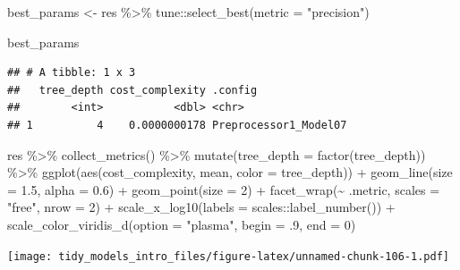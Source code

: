 \documentclass[
]{article}
\newenvironment{Shaded}{\begin{snugshade}}{\end{snugshade}}
\newcommand{\AttributeTok}[1]{\textcolor[rgb]{0.77,0.63,0.00}{#1}}
\newcommand{\DecValTok}[1]{\textcolor[rgb]{0.00,0.00,0.81}{#1}}
\newcommand{\FloatTok}[1]{\textcolor[rgb]{0.00,0.00,0.81}{#1}}
\newcommand{\FunctionTok}[1]{\textcolor[rgb]{0.00,0.00,0.00}{#1}}
\newcommand{\NormalTok}[1]{#1}
\newcommand{\OtherTok}[1]{\textcolor[rgb]{0.56,0.35,0.01}{#1}}
\newcommand{\SpecialCharTok}[1]{\textcolor[rgb]{0.00,0.00,0.00}{#1}}
\newcommand{\StringTok}[1]{\textcolor[rgb]{0.31,0.60,0.02}{#1}}
\begin{document}
\begin{Shaded}
\begin{Highlighting}[]
\NormalTok{best\_params }\OtherTok{\textless{}{-}}
\NormalTok{  res }\SpecialCharTok{\%\textgreater{}\%}
\NormalTok{  tune}\SpecialCharTok{::}\FunctionTok{select\_best}\NormalTok{(}\AttributeTok{metric =} \StringTok{"precision"}\NormalTok{)}

\NormalTok{best\_params}
\end{Highlighting}
\end{Shaded}

\begin{verbatim}
## # A tibble: 1 x 3
##   tree_depth cost_complexity .config              
##        <int>           <dbl> <chr>                
## 1          4    0.0000000178 Preprocessor1_Model07
\end{verbatim}

\begin{Shaded}
\begin{Highlighting}[]
\NormalTok{res }\SpecialCharTok{\%\textgreater{}\%}
  \FunctionTok{collect\_metrics}\NormalTok{() }\SpecialCharTok{\%\textgreater{}\%}
  \FunctionTok{mutate}\NormalTok{(}\AttributeTok{tree\_depth =} \FunctionTok{factor}\NormalTok{(tree\_depth)) }\SpecialCharTok{\%\textgreater{}\%}
  \FunctionTok{ggplot}\NormalTok{(}\FunctionTok{aes}\NormalTok{(cost\_complexity, mean, }\AttributeTok{color =}\NormalTok{ tree\_depth)) }\SpecialCharTok{+}
  \FunctionTok{geom\_line}\NormalTok{(}\AttributeTok{size =} \FloatTok{1.5}\NormalTok{, }\AttributeTok{alpha =} \FloatTok{0.6}\NormalTok{) }\SpecialCharTok{+}
  \FunctionTok{geom\_point}\NormalTok{(}\AttributeTok{size =} \DecValTok{2}\NormalTok{) }\SpecialCharTok{+}
  \FunctionTok{facet\_wrap}\NormalTok{(}\SpecialCharTok{\textasciitilde{}}\NormalTok{ .metric, }\AttributeTok{scales =} \StringTok{"free"}\NormalTok{, }\AttributeTok{nrow =} \DecValTok{2}\NormalTok{) }\SpecialCharTok{+}
  \FunctionTok{scale\_x\_log10}\NormalTok{(}\AttributeTok{labels =}\NormalTok{ scales}\SpecialCharTok{::}\FunctionTok{label\_number}\NormalTok{()) }\SpecialCharTok{+}
  \FunctionTok{scale\_color\_viridis\_d}\NormalTok{(}\AttributeTok{option =} \StringTok{"plasma"}\NormalTok{, }\AttributeTok{begin =}\NormalTok{ .}\DecValTok{9}\NormalTok{, }\AttributeTok{end =} \DecValTok{0}\NormalTok{)}
\end{Highlighting}
\end{Shaded}

\texttt{[image: tidy\_models\_intro\_files/figure-latex/unnamed-chunk-106-1.pdf]}
\end{document}

